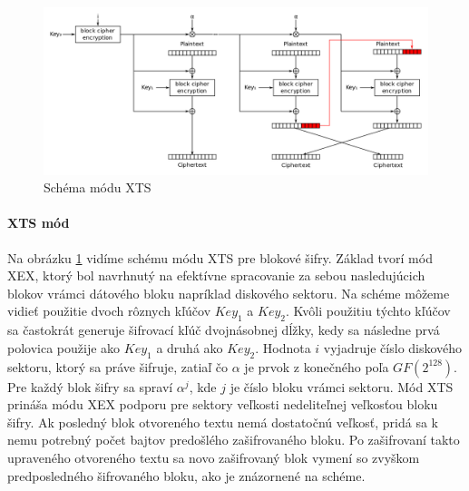 \begin{figure}[h]
    \centering
    \includegraphics[width=1\textwidth]{XTS_mode_encryption}
    \caption{Schéma módu XTS}
    \label{fig:XTS}
\end{figure}

\paragraph{XTS mód}
Na obrázku \ref{fig:XTS} vidíme schému módu XTS pre blokové šifry. Základ tvorí mód XEX, ktorý bol navrhnutý na efektívne spracovanie za sebou nasledujúcich blokov vrámci dátového bloku napríklad diskového sektoru. Na schéme môžeme vidieť použitie dvoch rôznych kľúčov \(Key_1\) a \(Key_2\). Kvôli použitiu týchto kľúčov sa častokrát generuje šifrovací kľúč dvojnásobnej dĺžky, kedy sa následne prvá polovica použije ako \(Key_1\) a druhá ako \(Key_2\). Hodnota \(i\) vyjadruje číslo diskového sektoru, ktorý sa práve šifruje, zatiaľ čo \(\alpha\) je prvok z konečného poľa \(GF(2^128)\). Pre každý blok šifry sa spraví \(\alpha^j\), kde \(j\) je číslo bloku vrámci sektoru. Mód XTS prináša módu XEX podporu pre sektory veľkosti nedeliteľnej veľkosťou bloku šifry. Ak posledný blok otvoreného textu nemá dostatočnú veľkosť, pridá sa k nemu potrebný počet bajtov predošlého zašifrovaného bloku. Po zašifrovaní takto upraveného otvoreného textu sa novo zašifrovaný blok vymení so zvyškom predposledného šifrovaného bloku, ako je znázornené na schéme.


